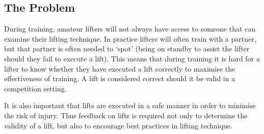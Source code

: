 \subsection{The Problem}

During training, amateur lifters will not always have access to someone that can examine their lifting technique. In practice lifters will often train with a partner, but that partner is often needed to `spot' (being on standby to assist the lifter should they fail to execute a lift). This means that during training it is hard for a lifter to know whether they have executed a lift correctly to maximise the effectiveness of training. A lift is considered correct should it be valid in a competition setting.

It is also important that lifts are executed in a safe manner in order to minimise the risk of injury. Thus feedback on lifts is required not only to determine the validity of a lift, but also to encourage best practices in lifting technique.